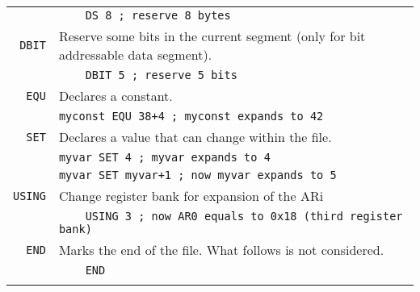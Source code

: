 \documentclass{article}
\begin{document}
\begin{tabularx}{\textwidth}{rX}
  &\texttt{\ \ \ \ DS 8 ; reserve 8 bytes}\\
  \noalign{\smallskip}
  \hline
  \noalign{\smallskip}
  \texttt{DBIT}&Reserve some bits in the current segment (only for bit
  addressable data segment).\\
  &\texttt{\ \ \ \ DBIT 5 ; reserve 5 bits}\\
  \noalign{\smallskip}
  \hline
  \noalign{\smallskip}
  \texttt{EQU}&Declares a constant.\\
  &\texttt{myconst EQU 38+4 ; myconst expands to 42}\\
  \noalign{\smallskip}
  \hline
  \noalign{\smallskip}
  \texttt{SET}&Declares a value that can change within the file.\\
  &\texttt{myvar SET 4 ; myvar expands to 4}\\
  &\texttt{myvar SET myvar+1 ; now myvar expands to 5}\\
  \noalign{\smallskip}
  \hline
  \noalign{\smallskip}
  \texttt{USING}&Change register bank for expansion of the ARi\\
  &\texttt{\ \ \ \ USING 3 ; now AR0 equals to 0x18 (third register bank)}\\
  \noalign{\smallskip}
  \hline
  \noalign{\smallskip}
  \texttt{END}&Marks the end of the file. What follows is not considered.\\
  &\texttt{\ \ \ \ END}\\
  \noalign{\smallskip}
  \hline
\end{tabularx}
\end{document}

